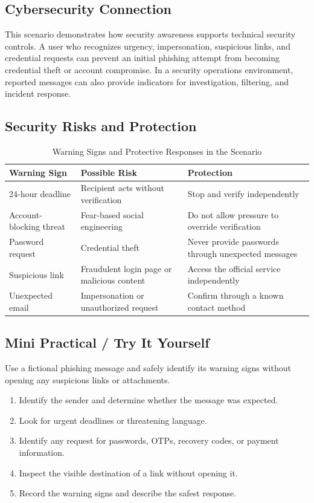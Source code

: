 \documentclass[11pt,a4paper]{article}
\begin{document}
\subsection{Cybersecurity Connection}

This scenario demonstrates how security awareness supports technical security controls. A user who recognizes urgency, impersonation, suspicious links, and credential requests can prevent an initial phishing attempt from becoming credential theft or account compromise. In a security operations environment, reported messages can also provide indicators for investigation, filtering, and incident response.

\subsection{Security Risks and Protection}

\begin{table}[H]
\centering\small
\begin{tabularx}{\textwidth}{|p{3.1cm}|X|X|}
\hline
\textbf{Warning Sign} & \textbf{Possible Risk} & \textbf{Protection}\\\hline
24-hour deadline & Recipient acts without verification & Stop and verify independently\\\hline
Account-blocking threat & Fear-based social engineering & Do not allow pressure to override verification\\\hline
Password request & Credential theft & Never provide passwords through unexpected messages\\\hline
Suspicious link & Fraudulent login page or malicious content & Access the official service independently\\\hline
Unexpected email & Impersonation or unauthorized request & Confirm through a known contact method\\\hline
\end{tabularx}
\caption{Warning Signs and Protective Responses in the Scenario}
\end{table}

\subsection{Mini Practical / Try It Yourself}

Use a fictional phishing message and safely identify its warning signs without opening any suspicious links or attachments.

\begin{enumerate}
    \item Identify the sender and determine whether the message was expected.
    \item Look for urgent deadlines or threatening language.
    \item Identify any request for passwords, OTPs, recovery codes, or payment information.
    \item Inspect the visible destination of a link without opening it.
    \item Record the warning signs and describe the safest response.
\end{enumerate}
\end{document}
